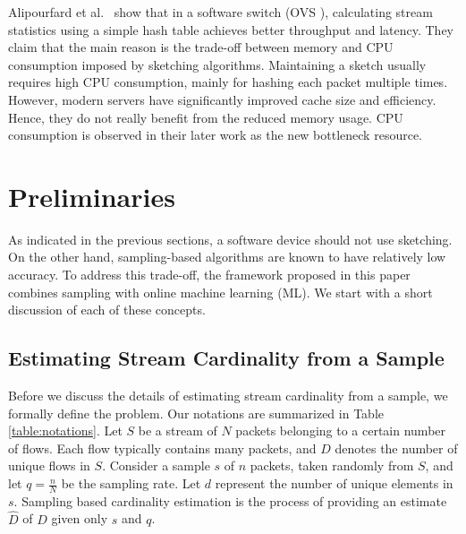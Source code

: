 	Alipourfard et al.\ \cite{alipourfard2015re} show that in a software switch (OVS \cite{pfaff2015design}), calculating stream statistics using a simple hash table achieves better throughput and latency. They claim that the main reason is the trade-off between memory and CPU consumption imposed by sketching algorithms. Maintaining a sketch usually requires high CPU consumption, mainly for hashing each packet multiple times. However, modern servers have significantly improved cache size and efficiency. Hence, they do not really benefit from the reduced memory usage. CPU consumption is observed in their later work \cite{alipourfard2018comparison} as the new bottleneck resource.
	
	
\section{Preliminaries} \label{sec:perliminaries}
	
	As indicated in the previous sections, a software device should not use sketching. On the other hand, sampling-based algorithms are known to have relatively low accuracy. To address this trade-off, the framework proposed in this paper combines sampling with online machine learning (ML). We start with a short discussion of each of these concepts.
	
	\subsection{Estimating Stream Cardinality from a Sample} \label{subsec:sampling}
	
		Before we discuss the details of estimating stream cardinality from a sample, we formally define the problem. Our notations are summarized in Table \ref{table:notations}. Let $S$ be a stream of $N$ packets belonging to a certain number of flows. Each flow typically contains many packets, and $D$ denotes the number of unique flows in $S$. Consider a sample $s$ of $n$ packets, taken randomly from $S$, and let $q=\frac{n}{N}$ be the sampling rate. Let $d$ represent the number of unique elements in $s$. Sampling based cardinality estimation is the process of providing an estimate $\hat{D}$ of $D$ given only $s$ and $q$.
		
